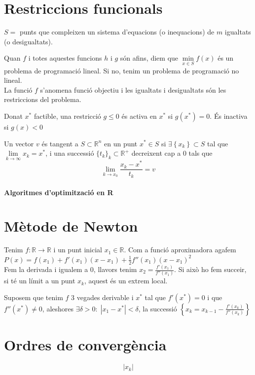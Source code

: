 \documentclass[../main.tex]{subfiles}
\begin{document}
\chapter{Restriccions funcionals}
$S = $ punts que compleixen un sistema d'equacions (o inequacions) de $m$ igualtats (o desigualtats).
\begin{notacio}
	Quan $f$ i totes aquestes funcions $h$ i $g$ són afins, diem que $\min\limits_{x \in S} f(x)$ és un problema de programació lineal. Si no, tenim un problema de programació no lineal.\\
	La funció $f$ s'anomena funció objectiu i les igualtats i desigualtats són les restriccions del problema.
\end{notacio}
\begin{definicio}
	Donat $x^*$ factible, una restricció $g \leq 0$ és activa en $x^*$ si $g(x^*) = 0$. És inactiva si $g(x) < 0$
\end{definicio}
\begin{definicio}
Un vector $v$ és tangent a $S \subset \mathbb{R}^n$ en un punt $x^* \in S$ si $\exists \left\{x_k\right\} \subset S$ tal que $\lim\limits_{k\to\infty}x_k = x^*$, i una successió $\{t_k\}_k\subset\mathbb{R}^+$ decreixent cap a $0$ tals que
\begin{displaymath}
\lim\limits_{k\to x_0}\frac{x_k-x^*}{t_k} = v
\end{displaymath}
\end{definicio}
\subsubsection{Algoritmes d'optimització en R}
\chapter{Mètode de Newton}

Tenim $f: \mathbb{R} \to \mathbb{R}$ i un punt inicial $x_1 \in \mathbb{R}$. Com a funció aproximadora agafem $P(x) = f(x_1) + f'(x_1)(x-x_1)+\frac{1}{2}f''(x_1)(x-x_1)^2$\\
Fem la derivada i igualem a $0$, llavors tenim $x_2 = \frac{f'(x_1)}{f''(x_1)}$. Si això ho fem succeir, si té un límit a un punt $x_k$, aquest és un extrem local.

\begin{proposicio}
	Suposem que tenim $f$ 3 vegades derivable i $x^*$ tal que $f'(x^*) = 0$ i que $f''(x^*) \neq 0$, aleshores $\exists \delta > 0:\;|x_1-x^*|<\delta$, la successió $\left\{x_k = x_{k-1} - \frac{f'(x_k)}{f''(x_k)}\right\}$
\end{proposicio}

\chapter{Ordres de convergència}

\begin{displaymath}
|x_k|
\end{displaymath}
\end{document}
